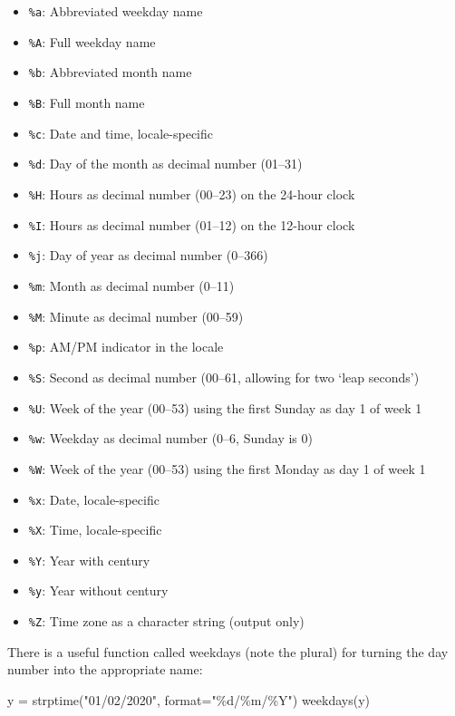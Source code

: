 \documentclass[
]{book}
\newenvironment{Shaded}{\begin{snugshade}}{\end{snugshade}}
\newcommand{\AttributeTok}[1]{\textcolor[rgb]{0.77,0.63,0.00}{#1}}
\newcommand{\FunctionTok}[1]{\textcolor[rgb]{0.00,0.00,0.00}{#1}}
\newcommand{\NormalTok}[1]{#1}
\newcommand{\OtherTok}[1]{\textcolor[rgb]{0.56,0.35,0.01}{#1}}
\newcommand{\StringTok}[1]{\textcolor[rgb]{0.31,0.60,0.02}{#1}}
\providecommand{\tightlist}{%
  \setlength{\itemsep}{0pt}\setlength{\parskip}{0pt}}
\begin{document}
\begin{itemize}
\tightlist
\item
  \texttt{\%a}: Abbreviated weekday name
\item
  \texttt{\%A}: Full weekday name
\item
  \texttt{\%b}: Abbreviated month name
\item
  \texttt{\%B}: Full month name
\item
  \texttt{\%c}: Date and time, locale-specific
\item
  \texttt{\%d}: Day of the month as decimal number (01--31)
\item
  \texttt{\%H}: Hours as decimal number (00--23) on the 24-hour clock
\item
  \texttt{\%I}: Hours as decimal number (01--12) on the 12-hour clock
\item
  \texttt{\%j}: Day of year as decimal number (0--366)
\item
  \texttt{\%m}: Month as decimal number (0--11)
\item
  \texttt{\%M}: Minute as decimal number (00--59)
\item
  \texttt{\%p}: AM/PM indicator in the locale
\item
  \texttt{\%S}: Second as decimal number (00--61, allowing for two `leap seconds')
\item
  \texttt{\%U}: Week of the year (00--53) using the first Sunday as day 1 of week 1
\item
  \texttt{\%w}: Weekday as decimal number (0--6, Sunday is 0)
\item
  \texttt{\%W}: Week of the year (00--53) using the first Monday as day 1 of week 1
\item
  \texttt{\%x}: Date, locale-specific
\item
  \texttt{\%X}: Time, locale-specific
\item
  \texttt{\%Y}: Year with century
\item
  \texttt{\%y}: Year without century
\item
  \texttt{\%Z}: Time zone as a character string (output only)
\end{itemize}

There is a useful function called weekdays (note the plural) for turning the day number into the appropriate name:

\begin{Shaded}
\begin{Highlighting}[]
\NormalTok{y }\OtherTok{=} \FunctionTok{strptime}\NormalTok{(}\StringTok{"01/02/2020"}\NormalTok{, }\AttributeTok{format=}\StringTok{"\%d/\%m/\%Y"}\NormalTok{)}
\FunctionTok{weekdays}\NormalTok{(y)}
\end{Highlighting}
\end{Shaded}
\end{document}
